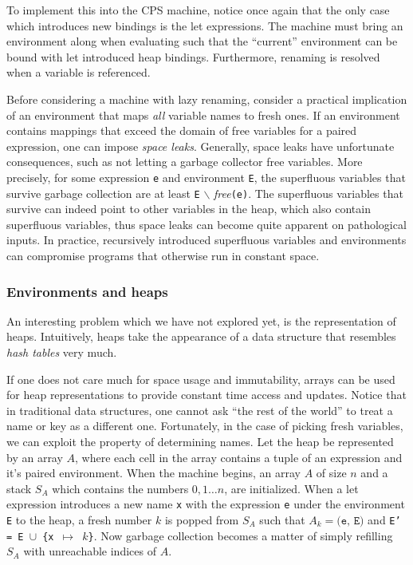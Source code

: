 To implement this into the CPS machine, notice once again that the only case which introduces new bindings is the let expressions.
The machine must bring an environment along when evaluating such that the ``current'' environment can be bound with let introduced heap bindings.
Furthermore, renaming is resolved when a variable is referenced.

Before considering a machine with lazy renaming, consider a practical implication of an environment that maps \textit{all} variable names to fresh ones.
If an environment contains mappings that exceed the domain of free variables for a paired expression, one can impose \textit{space leaks}.
Generally, space leaks have unfortunate consequences, such as not letting a garbage collector free variables.
More precisely, for some expression \texttt{e} and environment \texttt{E}, the superfluous variables that survive garbage collection are at least \texttt{E} $\backslash$ \textit{free}\texttt{(e)}.
The superfluous variables that survive can indeed point to other variables in the heap, which also contain superfluous variables, thus space leaks can become quite apparent on pathological inputs.
In practice, recursively introduced superfluous variables and environments can compromise programs that otherwise run in constant space.

\subsubsection{Environments and heaps}
An interesting problem which we have not explored yet, is the representation of heaps.
Intuitively, heaps take the appearance of a data structure that resembles \textit{hash tables} very much.

If one does not care much for space usage and immutability, arrays can be used for heap representations to provide constant time access and updates.
Notice that in traditional data structures, one cannot ask ``the rest of the world'' to treat a name or key as a different one.
Fortunately, in the case of picking fresh variables, we can exploit the property of determining names.
Let the heap be represented by an array $A$, where each cell in the array contains a tuple of an expression and it's paired environment.
When the machine begins, an array $A$ of size $n$ and a stack $S_A$ which contains the numbers $0,1 \dots n$, are initialized.
When a let expression introduces a new name \texttt{x} with the expression \texttt{e} under the environment \texttt{E} to the heap, a fresh number $k$ is popped from $S_A$ such that $A_k = \texttt{(e, E)}$ and \texttt{E' = E $\cup$ \{x $\mapsto$ $k$\}}.
Now garbage collection becomes a matter of simply refilling $S_A$ with unreachable indices of $A$.

